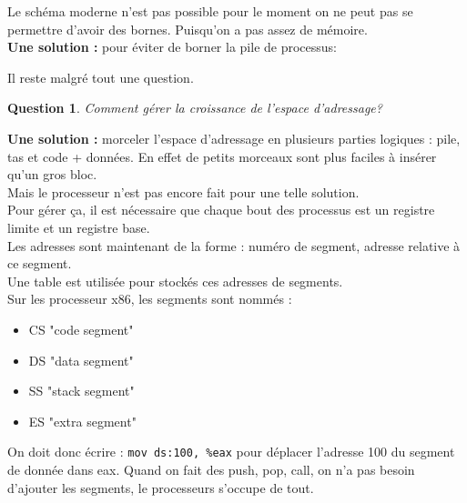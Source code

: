 \documentclass[12pt,a4paper]{report}
\newtheorem*{q}{Question}
\begin{document}
Le schéma moderne n'est pas possible pour le moment on ne peut pas se permettre d'avoir des bornes. Puisqu'on a pas assez de mémoire.\\
\textbf{Une solution :} pour éviter de borner la pile de processus:

\begin{center}
\end{center}
Il reste malgré tout une question.\\

\begin{q}Comment gérer la croissance de l'espace d'adressage?\end{q}
\textbf{Une solution :} morceler l'espace d'adressage en plusieurs parties logiques : pile, tas et code + données. En effet de petits morceaux sont plus faciles à insérer qu'un gros bloc.\\
Mais le processeur n'est pas encore fait pour une telle solution.\\
Pour gérer ça, il est nécessaire que chaque bout des processus est un registre limite et un registre base.\\

Les adresses sont maintenant de la forme : numéro de segment, adresse relative à ce segment.\\
Une table est utilisée pour stockés ces adresses de segments.\\

Sur les processeur x86, les segments sont nommés :
\begin{itemize}
\item CS "code segment"
\item DS "data segment"
\item SS "stack segment"
\item ES "extra segment"
\end{itemize} 

On doit donc écrire : \verb?mov ds:100, %eax? pour déplacer l'adresse 100 du segment de donnée dans eax. Quand on fait des push, pop, call, on n'a pas besoin d'ajouter les segments, le processeurs s'occupe de tout.
\end{document}
